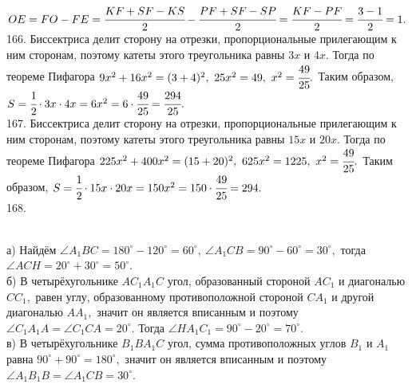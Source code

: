 \documentclass[12pt]{article}
\begin{document}
$OE=FO-FE=\cfrac{KF+SF-KS}{2}-\cfrac{PF+SF-SP}{2}=\cfrac{KF-PF}{2}=\cfrac{3-1}{2}=1.$\\
166. Биссектриса делит сторону на отрезки, пропорциональные прилегающим к ним сторонам, поэтому катеты этого треугольника равны $3x$ и $4x.$ Тогда по теореме Пифагора $9x^2+16x^2=(3+4)^2,\ 25x^2=49,\ x^2=\cfrac{49}{25}.$ Таким образом, $S=\cfrac{1}{2}\cdot3x\cdot4x=6x^2=6\cdot\cfrac{49}{25}=\cfrac{294}{25}.$\\
167. Биссектриса делит сторону на отрезки, пропорциональные прилегающим к ним сторонам, поэтому катеты этого треугольника равны $15x$ и $20x.$ Тогда по теореме Пифагора $225x^2+400x^2=(15+20)^2,\ 625x^2=1225,\ x^2=\cfrac{49}{25}.$ Таким образом, $S=\cfrac{1}{2}\cdot15x\cdot20x=150x^2=150\cdot\cfrac{49}{25}=294.$\\
168. \begin{figure}[ht!]
\end{figure}\\
а) Найдём $\angle A_1BC=180^\circ-120^\circ=60^\circ,\ \angle A_1CB=90^\circ-60^\circ=30^\circ,$ тогда $\angle ACH=20^\circ+30^\circ=50^\circ.$\\
б) В четырёхугольнике $AC_1A_1C$ угол, образованный стороной $AC_1$ и диагональю $CC_1,$ равен углу, образованному противоположной стороной $CA_1$ и другой диагональю $AA_1,$ значит он является вписанным и поэтому $\angle C_1A_1A=\angle C_1CA=20^\circ.$ Тогда $\angle HA_1C_1=90^\circ-20^\circ=70^\circ.$\\
в) В четырёхугольнике $B_1BA_1C$ угол, сумма противоположных углов $B_1$ и $A_1$ равна $90^\circ+90^\circ=180^\circ,$ значит он является вписанным и поэтому
$\angle A_1B_1B=\angle A_1CB=30^\circ.$\\
\end{document}
